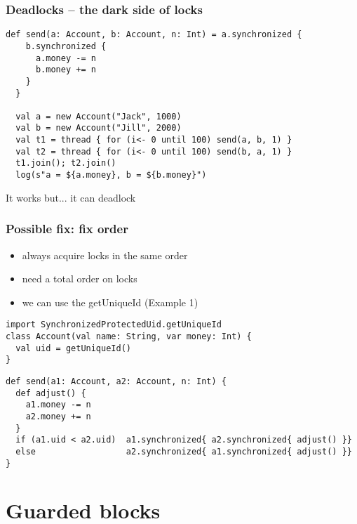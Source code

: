 \documentclass[aspectratio=169]{beamer}
\begin{document}
\begin{frame}[fragile]\frametitle{Deadlocks -- the dark side of locks}
\begin{lstlisting}[emph={assert,sleep,log,thread,join,synchronized}]
  def send(a: Account, b: Account, n: Int) = a.synchronized {
    b.synchronized {
      a.money -= n
      b.money += n
    }
  }

  val a = new Account("Jack", 1000)
  val b = new Account("Jill", 2000)
  val t1 = thread { for (i<- 0 until 100) send(a, b, 1) }
  val t2 = thread { for (i<- 0 until 100) send(b, a, 1) }
  t1.join(); t2.join()
  log(s"a = ${a.money}, b = ${b.money}")
\end{lstlisting}

{\Large \pause It works but... \pause \alert{it can deadlock}}
\end{frame}


\begin{frame}[fragile]\frametitle{Possible fix: fix order}

\begin{itemize}
  \item always acquire locks in the same order
  \item need a total order on locks
  \item we can use the getUniqueId (Example 1)
\end{itemize}
    
\begin{lstlisting}[emph={getUniqueId,sleep,log,thread,join,synchronized}]
import SynchronizedProtectedUid.getUniqueId
class Account(val name: String, var money: Int) {
  val uid = getUniqueId()
}
\end{lstlisting}
\pause
\begin{lstlisting}[emph={assert,sleep,log,thread,join,synchronized}]
def send(a1: Account, a2: Account, n: Int) {
  def adjust() {
    a1.money -= n
    a2.money += n
  }
  if (a1.uid < a2.uid)  a1.synchronized{ a2.synchronized{ adjust() }}
  else                  a2.synchronized{ a1.synchronized{ adjust() }}
}
\end{lstlisting}
\end{frame}

\section{Guarded blocks}
\end{document}
